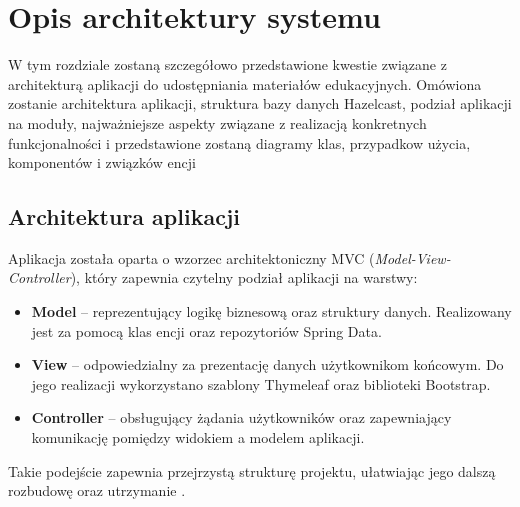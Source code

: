 %


\sloppy

\chapter{Opis architektury systemu}

W tym rozdziale zostaną szczegółowo przedstawione kwestie związane z architekturą aplikacji do udostępniania materiałów edukacyjnych. Omówiona zostanie architektura aplikacji, struktura bazy danych Hazelcast, podział aplikacji na moduły, najważniejsze aspekty związane z realizacją konkretnych funkcjonalności i przedstawione zostaną diagramy klas, przypadkow użycia, komponentów i związków encji

\section{Architektura aplikacji}

Aplikacja została oparta o wzorzec architektoniczny MVC (\textit{Model-View-Controller}), który zapewnia czytelny podział aplikacji na warstwy:

\begin{itemize}
\item \textbf{Model} – reprezentujący logikę biznesową oraz struktury danych. Realizowany jest za pomocą klas encji oraz repozytoriów Spring Data.
\item \textbf{View} – odpowiedzialny za prezentację danych użytkownikom końcowym. Do jego realizacji wykorzystano szablony Thymeleaf oraz biblioteki Bootstrap.
\item \textbf{Controller} – obsługujący żądania użytkowników oraz zapewniający komunikację pomiędzy widokiem a modelem aplikacji.
\end{itemize}

Takie podejście zapewnia przejrzystą strukturę projektu, ułatwiając jego dalszą rozbudowę oraz utrzymanie \cite{microservices}.

